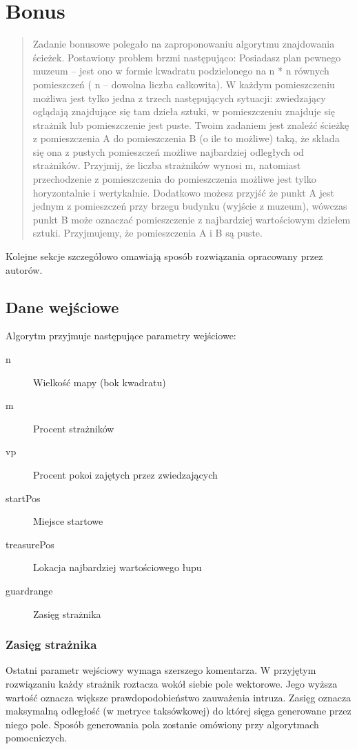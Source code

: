 \documentclass[12pt]{article}
\begin{document}
\section{Bonus}
\begin{quote}
Zadanie bonusowe polegało na zaproponowaniu algorytmu znajdowania ścieżek. Postawiony problem brzmi następująco: 
Posiadasz plan pewnego muzeum – jest ono w formie kwadratu podzielonego na n * n równych
pomieszczeń ( n – dowolna liczba całkowita). W każdym pomieszczeniu możliwa jest tylko jedna z
trzech następujących sytuacji: zwiedzający oglądają znajdujące się tam dzieła sztuki, w
pomieszczeniu znajduje się strażnik lub pomieszczenie jest puste. Twoim zadaniem jest znaleźć
ścieżkę z pomieszczenia A do pomieszczenia B (o ile to możliwe) taką, że składa się ona z pustych
pomieszczeń możliwe najbardziej odległych od strażników. Przyjmij, że liczba strażników wynosi
m, natomiast przechodzenie z pomieszczenia do pomieszczenia możliwe jest tylko horyzontalnie i
wertykalnie. Dodatkowo możesz przyjść że punkt A jest jednym z pomieszczeń przy brzegu
budynku (wyjście z muzeum), wówczas punkt B może oznaczać pomieszczenie z najbardziej
wartościowym dziełem sztuki. Przyjmujemy, że pomieszczenia A i B są puste.
\end{quote}
Kolejne sekcje szczegółowo omawiają sposób rozwiązania opracowany przez autorów.
\subsection{Dane wejściowe}
Algorytm przyjmuje następujące parametry wejściowe:
\begin{description}
\item[n] Wielkość mapy (bok kwadratu)
\item[m] Procent strażników
\item[vp] Procent pokoi zajętych przez zwiedzających
\item[startPos] Miejsce startowe
\item[treasurePos] Lokacja najbardziej wartościowego łupu
\item[guard\textunderscore range] Zasięg strażnika

\end{description}
\subsubsection{Zasięg strażnika}
Ostatni parametr wejściowy wymaga szerszego komentarza. W przyjętym rozwiązaniu każdy strażnik roztacza wokół siebie pole wektorowe. Jego wyższa wartość oznacza większe prawdopodobieństwo zauważenia intruza. Zasięg oznacza maksymalną odległość (w metryce taksówkowej) do której sięga generowane przez niego pole. Sposób generowania pola zostanie omówiony przy algorytmach pomocniczych.
\end{document}
